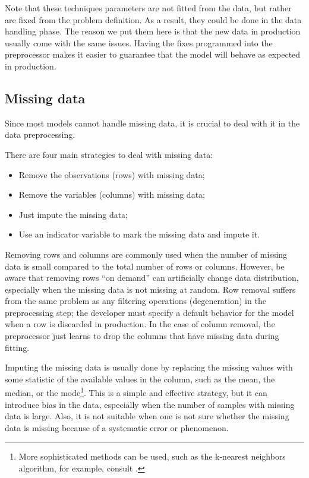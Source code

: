 Note that these techniques parameters are not fitted from the data, but rather are fixed
from the problem definition.  As a result, they could be done in the data handling phase.
The reason we put them here is that the new data in production usually come with the
same issues.  Having the fixes programmed into the preprocessor makes it easier to
guarantee that the model will behave as expected in production.

\subsection{Missing data}

Since most models cannot handle missing data, it is crucial to deal with it in the data
preprocessing.

There are four main strategies to deal with missing data:
\begin{itemize}
  \itemsep0em
  \item Remove the observations (rows) with missing data;
  \item Remove the variables (columns) with missing data;
  \item Just impute the missing data;
  \item Use an indicator variable to mark the missing data and impute it.
\end{itemize}

Removing rows and columns are commonly used when the number of missing data is small
compared to the total number of rows or columns.  However, be aware that removing rows
``on demand'' can
artificially change data distribution, especially when the missing data is not missing at
random.  Row removal suffers from the same problem as any filtering operations
(degeneration) in the preprocessing step; the developer must specify a default behavior
for the model when a row is discarded in production.  In the case of column removal, the
preprocessor just learns to drop the columns that have missing data during fitting.

Imputing the missing data is usually done by replacing the missing values with some
statistic of the available values in the column, such as the mean, the median, or the
mode\footnote{More sophisticated methods can be used, such as the k-nearest neighbors
algorithm, for example, consult .}.  This is a simple and
effective strategy, but it can introduce bias in the data, especially when the number of
samples with missing data is large.
Also, it is not suitable when one is not sure whether the missing data is missing because
of a systematic error or phenomenon.

